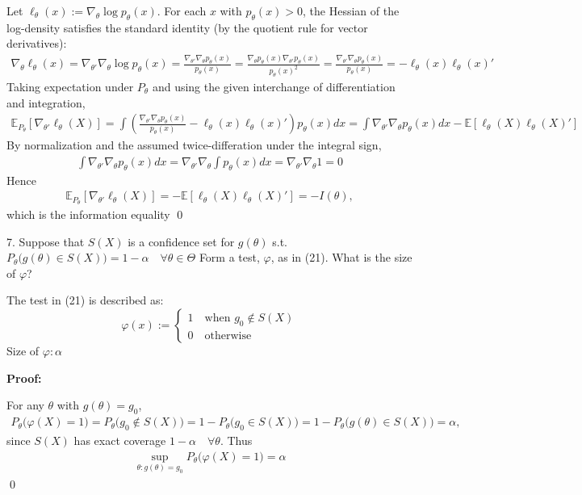 \documentclass[10pt]{article}
\begin{document}
Let $\ell_\theta(x) := \nabla_\theta\log p_\theta(x)$. For each $x $ with $p_\theta(x) > 0 $, the Hessian of the log-density satisfies the standard identity (by the quotient rule for vector derivatives):
\begin{gather*}
    \nabla_\theta\ell_\theta(x) = \nabla_{\theta'}\nabla_\theta\log p_\theta(x) = \frac{\nabla_{\theta'}\nabla_\theta p_\theta(x)}{p_\theta(x)} = \frac{\nabla_\theta p_\theta(x)\nabla_{\theta'}p_\theta(x)}{p_\theta(x)^2} = \frac{\nabla_{\theta'}\nabla_\theta p_\theta(x)}{p_\theta(x)} = -\ell_\theta(x)\ell_\theta(x)'
\end{gather*}
Taking expectation under $P_\theta $ and using the given interchange of differentiation and integration,
\begin{gather*}
    \mathbb{E}_{P_\theta}[\nabla_{\theta'}\ell_\theta(X)] = \int \left(\frac{\nabla_{\theta'}\nabla_\theta p_\theta(x)}{p_\theta(x)} -\ell_\theta(x)\ell_\theta(x)'\right)p_\theta(x) dx = \int \nabla_{\theta'}\nabla_\theta p_\theta(x) dx - \mathbb{E}[\ell_\theta(X)\ell_\theta(X)']
\end{gather*}
By normalization and the assumed twice-differation under the integral sign,
\begin{gather*}
    \int \nabla_{\theta'}\nabla_\theta p_\theta(x) dx = \nabla_{\theta'}\nabla_\theta \int p_\theta(x) dx = \nabla_{\theta'}\nabla_\theta1 = 0
\end{gather*}
Hence 
\begin{gather*}
    \mathbb{E}_{P_\theta}[\nabla_{\theta'}\ell_\theta(X)] = - \mathbb{E}[\ell_\theta(X)\ell_\theta(X)'] = - I(\theta),
\end{gather*}
which is the information equality \qed

\newpage 

7. Suppose that $S(X)$ is a confidence set for $g(\theta)$ s.t. $P_\theta\big(g(\theta)\in S(X)\big) = 1 - \alpha \quad\forall\theta\in\Theta$ Form a test, $\varphi $, as in (21). What is the size of $\varphi $?

The test in (21) is described as:
\[
\varphi(x) :=
\begin{cases}
    1\quad\text{when }g_0\notin S(X)\\
    0\quad\text{otherwise}
\end{cases}
\]
Size of $\varphi: \alpha $

\textbf{Proof: }

For any $\theta $ with $g(\theta) = g_0 $,
\begin{gather*}
    P_\theta\big(\varphi(X) = 1\big) = P_\theta\big(g_0\notin S(X)\big) = 1 - P_\theta\big(g_0\in S(X)\big) = 1 - P_\theta\big(g(\theta) \in S(X)\big) =\alpha,
\end{gather*}
since $S(X)$ has exact coverage $1 - \alpha \quad\forall\theta $. Thus 
\begin{gather*}
    \sup_{\theta : g(\theta) = g_0}P_{\theta}\big(\varphi(X) = 1\big) = \alpha
\end{gather*}
\qed
\end{document}
